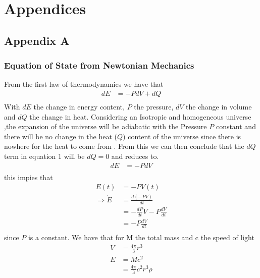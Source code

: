 \documentclass[a4paper, 11pt]{FSKH_623_Report}
\numberwithin{equation}{section}
\newcommand{\driv}[2]{\frac{d #1}{d #2}}
\begin{document}
\newpage
\chapter{Appendices}
\section*{Appendix A}
\subsection*{Equation of State from Newtonian Mechanics}

From the first law of thermodynamics we have that  
\begin{equation}
\begin{split}
dE &= -PdV + dQ\\
\end{split}
\end{equation}
With $dE$ the change in energy content, $P$ the pressure, $dV$ the change in volume and $dQ$ the change in heat.
Considering an Isotropic and homogeneous universe \citep{notes4},the expansion of the universe will be adiabatic with the Pressure $P$ constant and there will be no change in the heat ($Q$) content of the universe since there is nowhere for the heat to come from \citep{notes4}. From this we can then conclude that the $dQ$ term in equation 1 will be $dQ=0$ and reduces to.
\begin{equation}
\begin{split}
dE &= -PdV \\
\end{split}
\end{equation}
this impies that
\begin{equation}
\begin{split}
E(t) &= -PV(t)\\
\Rightarrow \dot{E} &= \frac{d\left(-PV\right)}{dt}\\
&= -\driv{P}{t}V-P\driv{V}{t}\\
&= -P\driv{V}{t}             \\
\end{split}
\end{equation}
since $P$ is a constant.
We have that for M the total mass and c the speed of light 
\begin{equation}
\begin{split}
V &= \frac{4\pi}{3}r^{3}\\
E &= Mc^{2}\\
&=\frac{4\pi}{3}c^{2}r^{3}\rho\\
\end{split}
\end{equation}
\end{document}
